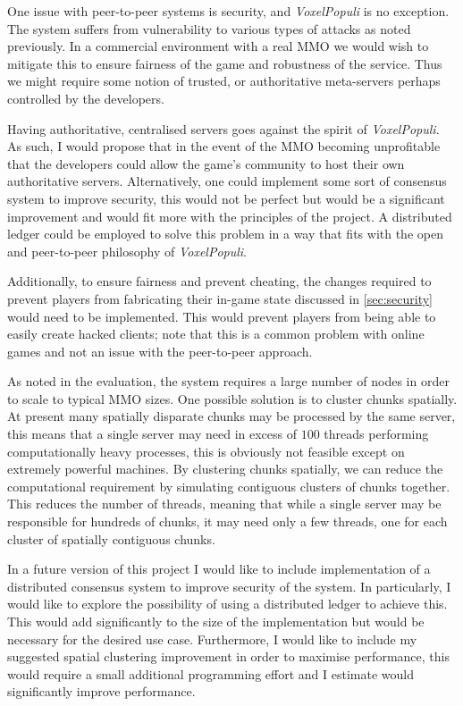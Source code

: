 \documentclass[12pt,notitlepage,a4paper]{report}
\newcommand{\voxpop}{\emph{VoxelPopuli}}
\begin{document}
	One issue with peer-to-peer systems is security, and \voxpop{} is no exception. The system suffers from vulnerability to various types of attacks as noted previously. In a commercial environment with a real MMO we would wish to mitigate this to ensure fairness of the game and robustness of the service. Thus we might require some notion of trusted, or authoritative meta-servers perhaps controlled by the developers.
	
	Having authoritative, centralised servers goes against the spirit of \voxpop{}. As such, I would propose that in the event of the MMO becoming unprofitable that the developers could allow the game's community to host their own authoritative servers. Alternatively, one could implement some sort of consensus system to improve security, this would not be perfect but would be a significant improvement and would fit more with the principles of the project. A distributed ledger could be employed to solve this problem in a way that fits with the open and peer-to-peer philosophy of \voxpop{}.
	
	Additionally, to ensure fairness and prevent cheating, the changes required to prevent players from fabricating their in-game state discussed in \cref{sec:security} would need to be implemented. This would prevent players from being able to easily create hacked clients; note that this is a common problem with online games and not an issue with the peer-to-peer approach.
	
	As noted in the evaluation, the system requires a large number of nodes in order to scale to typical MMO sizes. One possible solution is to cluster chunks spatially. At present many spatially disparate chunks may be processed by the same server, this means that a single server may need in excess of $100$ threads performing computationally heavy processes, this is obviously not feasible except on extremely powerful machines. By clustering chunks spatially, we can reduce the computational requirement by simulating contiguous clusters of chunks together. This reduces the number of threads, meaning that while a single server may be responsible for hundreds of chunks, it may need only a few threads, one for each cluster of spatially contiguous chunks.
	
	In a future version of this project I would like to include implementation of a distributed consensus system to improve security of the system. In particularly, I would like to explore the possibility of using a distributed ledger to achieve this. This would add significantly to the size of the implementation but would be necessary for the desired use case. Furthermore, I would like to include my suggested spatial clustering improvement in order to maximise performance, this would require a small additional programming effort and I estimate would significantly improve performance.
	
\end{document}
